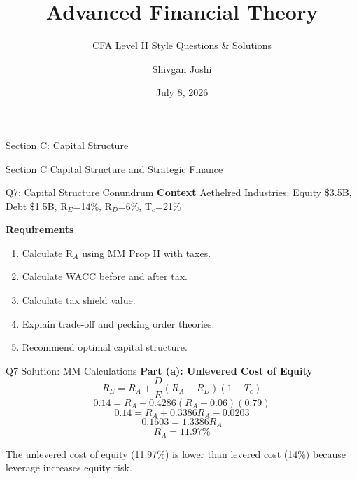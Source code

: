 \documentclass[aspectratio=169,10pt]{beamer}
\title[Synoptic Exam]{Advanced Financial Theory}
\subtitle{CFA Level II Style Questions \& Solutions}
\author{Shivgan Joshi}
\date{July 8, 2026}
\renewcommand{\small}{\fontsize{6pt}{7.5pt}\selectfont}
\renewcommand{\large}{\fontsize{8pt}{10pt}\selectfont}
\renewcommand{\Large}{\fontsize{9pt}{11pt}\selectfont}
\newcommand{\question}[1]{{\large\bfseries\color{crimson}#1}}
\begin{document}
	
	\begin{frame}
		\titlepage
	\end{frame}
	
	\begin{frame}{Section C: Capital Structure}
		\begin{center}
			\Large\textcolor{navyblue}{Section C}
			\vspace{0.2cm}
			\large Capital Structure and Strategic Finance
		\end{center}
	\end{frame}
	
	\begin{frame}{Q7: Capital Structure Conundrum}
		\question{Context}
		\small
		Aethelred Industries: Equity \$3.5B, Debt \$1.5B, R$_E$=14\%, R$_D$=6\%, T$_c$=21\%
		\vspace{0.1cm}
		
		\question{Requirements}
		\begin{enumerate}
			\item Calculate R$_A$ using MM Prop II with taxes.
			\item Calculate WACC before and after tax.
			\item Calculate tax shield value.
			\item Explain trade-off and pecking order theories.
			\item Recommend optimal capital structure.
		\end{enumerate}
	\end{frame}
	
	\begin{frame}{Q7 Solution: MM Calculations}
		\question{Part (a): Unlevered Cost of Equity}
		\small
		\[
		R_E = R_A + \frac{D}{E}(R_A - R_D)(1 - T_c)
		\]
		\[
		0.14 = R_A + 0.4286(R_A - 0.06)(0.79)
		\]
		\[
		0.14 = R_A + 0.3386R_A - 0.0203
		\]
		\[
		0.1603 = 1.3386R_A
		\]
		\[
		\boxed{R_A = 11.97\%}
		\]
		
		\vspace{0.1cm}
		\small
		The unlevered cost of equity (11.97\%) is lower than levered cost (14\%) because leverage increases equity risk.
	\end{frame}
	
\end{document}
